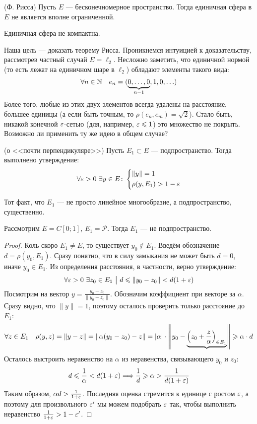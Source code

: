 \begin{theorem} (Ф. Рисса)
	Пусть $E$ --- бесконечномерное пространство. Тогда единичная сфера в $E$ не является вполне ограниченной.
\end{theorem}

\begin{corollary}
	Единичная сфера не компактна.
\end{corollary}

\begin{note}
	Наша цель --- доказать теорему Рисса. Проникнемся интуицией к доказательству, рассмотрев частный случай $E = \ell_2$. Несложно заметить, что единичной нормой (то есть лежат на единичном шаре в $\ell_2$) обладают элементы такого вида:
	\[
		\forall n \in \mathbb{N}\quad e_n = (\underbrace{0, \ldots, 0}_{n - 1}, 1, 0, \ldots)
	\]
	Более того, любые из этих двух элементов всегда удалены на расстояние, большее единицы (а если быть точным, то $\rho(e_n, e_m) = \sqrt{2}$). Стало быть, никакой конечной $\varepsilon$-сетью (для, например, $\varepsilon \leqslant 1$) это множество не покрыть. Возможно ли применить ту же идею в общем случае?
\end{note}

\begin{lemma} (о <<почти перпендикуляре>>)
	Пусть $E_1 \subset E$ --- подпространство. Тогда выполнено утверждение:
	\[
		\forall \varepsilon > 0\ \exists y \in E \colon \left\{ \begin{aligned} 
			&{\|y\| = 1}
			\\
			&{\rho(y, E_1) > 1 - \varepsilon}
		 \end{aligned} \right.
	\]
\end{lemma}

\begin{note}
	Тот факт, что $E_1$ --- не просто линейное многообразие, а подпространство, существенно.
	
	Рассмотрим $E = C[0; 1]$, $E_1 = \mathcal{P}$. Тогда $E_1$ --- не подпространство.
\end{note}

\begin{proof}
	Коль скоро $E_1 \neq E$, то существует $y_0 \notin E_1$. Введём обозначение $d = \rho(y_0, E_1)$. Сразу понятно, что в силу замыкания не может быть $d = 0$, иначе $y_0 \in E_1$. Из определения расстояния, в частности, верно утверждение:
	\[
		\forall \varepsilon > 0\ \exists z_0 \in E_1 \ \big|\  d \leqslant \|y_0 - z_0\| < d(1 + \varepsilon)
	\]
	Посмотрим на вектор $y = \frac{y_0 - z_0}{\|y_0 - z_0\|}$. Обозначим коэффициент при векторе за $\alpha$. Сразу видно, что $\|y\| = 1$, поэтому осталось проверить только расстояние до $E_1$:
	\[
		\forall z \in E_1\quad \rho(y, z) = \|y - z\| = \|\alpha(y_0 - z_0) - z\| = |\alpha| \cdot \left\|y_0 - \underbrace{\left(z_0 + \frac{z}{\alpha}\right)_{\in E_1}}\right\| \geqslant \alpha \cdot d
	\]
	Осталось выстроить неравенство на $\alpha$ из неравенства, связывающего $y_0$ и $z_0$:
	\[
		d \leqslant \frac{1}{\alpha} < d(1 + \varepsilon) \Longrightarrow \frac{1}{d} \geqslant \alpha > \frac{1}{d(1 + \varepsilon)}
	\]
	Таким образом, $\alpha d > \frac{1}{1 + \varepsilon}$. Последняя оценка стремится к единице с ростом $\varepsilon$, а поэтому для произвольного $\varepsilon'$ мы можем подобрать $\varepsilon$ так, чтобы выполнить неравенство $\frac{1}{1 + \varepsilon} > 1 - \varepsilon'$.
\end{proof}

